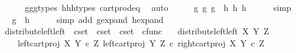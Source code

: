 \begin{isabellebody}
\ \ \ \ \isamarkupfalse%
\ g{}{\isacharunderscore}{\kern0pt}g{}{\isacharunderscore}{\kern0pt}g{}{\isacharunderscore}{\kern0pt}types\ h{}{\isacharunderscore}{\kern0pt}h{}{\isacharunderscore}{\kern0pt}h{}{\isacharunderscore}{\kern0pt}types\ cart{\isacharunderscore}{\kern0pt}prod{\isacharunderscore}{\kern0pt}eq{}\ \isamarkupfalse%
\ auto\isanewline
\ \ \isamarkupfalse%
\ \isamarkupfalse%
\ {\isachardoublequoteopen}{\isasymlangle}{\isasymlangle}g{}{\isacharcomma}{\kern0pt}\ g{}{\isasymrangle}{\isacharcomma}{\kern0pt}\ g{}{\isasymrangle}\ {\isacharequal}{\kern0pt}\ {\isasymlangle}{\isasymlangle}h{}{\isacharcomma}{\kern0pt}\ h{}{\isasymrangle}{\isacharcomma}{\kern0pt}\ h{}{\isasymrangle}{\isachardoublequoteclose}\isanewline
\ \ \ \ \isamarkupfalse%
\ simp\isanewline
\ \ \isamarkupfalse%
\ \isamarkupfalse%
\ {\isachardoublequoteopen}g\ {\isacharequal}{\kern0pt}\ h{\isachardoublequoteclose}\isanewline
\ \ \ \ \isamarkupfalse%
\ {\isacharparenleft}{\kern0pt}simp\ add{\isacharcolon}{\kern0pt}\ g{\isacharunderscore}{\kern0pt}expand\ h{\isacharunderscore}{\kern0pt}expand{\isacharparenright}{\kern0pt}\isanewline
{}\isamarkupfalse%
%
\endisatagproof
{\isafoldproof}%
%
\isadelimproof
%
\endisadelimproof
%
\isadelimdocument
%
\endisadelimdocument
%
\isatagdocument
%
\isamarkuptrue%
%
\endisatagdocument
{\isafolddocument}%
%
\isadelimdocument
%
\endisadelimdocument
{}\isamarkupfalse%
\ distribute{\isacharunderscore}{\kern0pt}left{\isacharunderscore}{\kern0pt}left\ {\isacharcolon}{\kern0pt}{\isacharcolon}{\kern0pt}\ {\isachardoublequoteopen}cset\ {\isasymRightarrow}\ cset\ {\isasymRightarrow}\ cset\ {\isasymRightarrow}\ cfunc{\isachardoublequoteclose}\ \isanewline
\ \ {\isachardoublequoteopen}distribute{\isacharunderscore}{\kern0pt}left{\isacharunderscore}{\kern0pt}left\ X\ Y\ Z\ {\isacharequal}{\kern0pt}\ \isanewline
\ \ \ \ {\isasymlangle}left{\isacharunderscore}{\kern0pt}cart{\isacharunderscore}{\kern0pt}proj\ X\ {\isacharparenleft}{\kern0pt}Y\ {\isasymtimes}\isactrlsub c\ Z{\isacharparenright}{\kern0pt}{\isacharcomma}{\kern0pt}\ left{\isacharunderscore}{\kern0pt}cart{\isacharunderscore}{\kern0pt}proj\ Y\ Z\ {\isasymcirc}\isactrlsub c\ right{\isacharunderscore}{\kern0pt}cart{\isacharunderscore}{\kern0pt}proj\ X\ {\isacharparenleft}{\kern0pt}Y\ {\isasymtimes}\isactrlsub c\ Z{\isacharparenright}{\kern0pt}{\isasymrangle}{\isachardoublequoteclose}\isanewline

\end{isabellebody}
